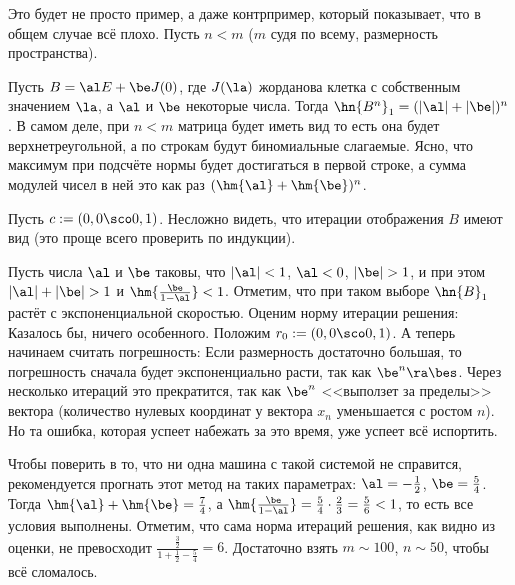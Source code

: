 \documentclass[a4paper]{article}
\begin{document}
\begin{ex}
Это будет не просто пример, а даже контрпример, который показывает,
что в общем случае всё плохо.  Пусть $n < m$ ($m$ судя по всему,
размерность пространства).

Пусть $B = \al E + \be J(0)$, где $J(\la)$ жорданова клетка с
собственным значением $\la$, а $\al$ и $\be$ некоторые числа.  Тогда
$\hn{B^n}_1 = (|\al|+|\be|)^n$. В самом деле, при $n < m$ матрица
будет иметь вид  то
есть она будет верхнетреугольной, а по строкам будут биномиальные
слагаемые.  Ясно, что максимум при подсчёте нормы будет достигаться в
первой строке, а сумма модулей чисел в ней это как раз $(\hm{\al} +
\hm{\be})^n$.

Пусть $c := (0,0\sco0, 1)$.  Несложно видеть, что итерации отображения
$B$ имеют вид  (это проще всего проверить по индукции).

Пусть числа $\al$ и $\be$ таковы, что $|\al| <1$, $\al < 0$,
$|\be|>1$, и при этом $|\al|+|\be| > 1$ и $\hm{\frac{\be}{1-\al}} <1$.
Отметим, что при таком выборе $\hn{B}_1$ растёт с экспоненциальной
скоростью.  Оценим норму итерации решения:   Казалось бы, ничего особенного. Положим
$r_0 := (0,0\sco 0,1)$. А теперь начинаем считать погрешность:
  Если размерность достаточно большая, то погрешность
сначала будет экспоненциально расти, так как $\be^n\ra\bes$. Через
несколько итераций это прекратится, так как $\be^n$ <<выползет за
пределы>> вектора (количество нулевых координат у вектора $x_n$
уменьшается с ростом $n$). Но та ошибка, которая успеет набежать за
это время, уже успеет всё испортить.

Чтобы поверить в то, что ни одна машина с такой системой не справится,
рекомендуется прогнать этот метод на таких параметрах: $\al =
-\frac12$, $\be = \frac54$. Тогда $\hm{\al} + \hm{\be} = \frac74$, а
$\hm{\frac{\be}{1-\al}} = \frac{5}{4}\cdot\frac{2}{3} = \frac{5}{6} <
1$, то есть все условия выполнены.  Отметим, что сама норма итераций
решения, как видно из оценки, не превосходит $\frac{\frac{3}{2}}{1 +
  \frac12 - \frac54} = 6$.  Достаточно взять $m \sim 100$, $n \sim
50$, чтобы всё сломалось.
\end{ex}
\end{document}
